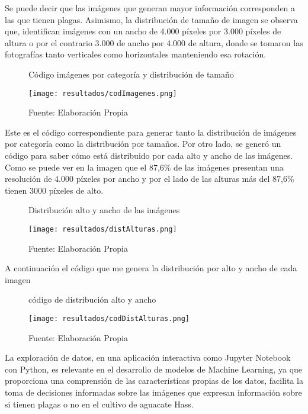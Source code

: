 Se puede decir que las imágenes que generan mayor información corresponden a las que tienen plagas. Asimismo, la distribución de tamaño de imagen se observa que, identifican imágenes con un ancho de 4.000 píxeles por 3.000 píxeles de altura o por el contrario 3.000 de ancho por 4.000 de altura, donde se tomaron las fotografías tanto verticales como horizontales manteniendo esa rotación.

\newpage

\begin{figure}[h]
\centering
\caption{Código imágenes por categoría y distribución de tamaño}
\texttt{[image: resultados/codImagenes.png]}
\caption*{\footnotesize Fuente: Elaboración Propia}
\label{fig:figuraCodImagenes}
\end{figure}

Este es el código correspondiente para generar tanto la distribución de imágenes por categoría como la distribución por tamaños. 
Por otro lado, se generó un código para saber cómo está distribuido por cada alto y ancho de las imágenes. Como se puede ver en la imagen que el 87,6\% de las imágenes presentan una resolución de 4.000 píxeles por ancho y por el lado de las alturas más del 87,6\% tienen 3000 píxeles de alto.

\newpage

\begin{figure}[h]
\centering
\caption{Distribución alto y ancho de las imágenes}
\texttt{[image: resultados/distAlturas.png]}
\caption*{\footnotesize Fuente: Elaboración Propia}
\label{fig:figuraDistAlturas}
\end{figure}

A continuación el código que me genera la distribución por alto y ancho de cada imagen

\newpage

\begin{figure}[h]
\centering
\caption{código de distribución alto y ancho}
\texttt{[image: resultados/codDistAlturas.png]}
\caption*{\footnotesize Fuente: Elaboración Propia}
\label{fig:figuraCodDistAlturas}
\end{figure}

La exploración de datos, en una aplicación interactiva como Jupyter Notebook con Python, es relevante en el desarrollo de modelos de Machine Learning, ya que proporciona una comprensión de las características propias de los datos, facilita la toma de decisiones informadas sobre las imágenes que expresan información sobre si tienen plagas o no en el cultivo de aguacate Hass.

